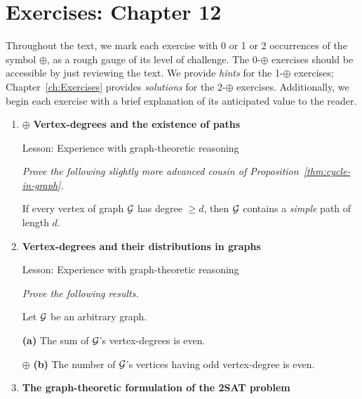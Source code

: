 
\section{Exercises: Chapter 12}

Throughout the text, we mark each exercise with 0 or 1 or 2 occurrences of the symbol $\oplus$, as a rough gauge of its level of challenge.  The 0-$\oplus$ exercises should be accessible by just reviewing the text.  We provide {\em hints} for the 1-$\oplus$ exercises; Chapter~\ref{ch:Exercises} provides {\em solutions} for the 2-$\oplus$ exercises.  Additionally, we begin each exercise with a brief explanation of its anticipated value to the reader.

\begin{enumerate}
\item
$\oplus$
{\bf Vertex-degrees and the existence of paths}

{\sc Lesson:} Experience with graph-theoretic reasoning

\smallskip

{\em Prove the following slightly more advanced cousin of Proposition~\ref{thm:cycle-in-graph}.}

 

\begin{prop}
If every vertex of graph $\mbox{$\cal G$}$ has degree $\geq d$, then $\mbox{$\cal G$}$ contains a {\em simple} path of length $d$.
\end{prop}

\smallskip

\medskip\item
{\bf Vertex-degrees and their distributions in graphs}

{\sc Lesson:} Experience with graph-theoretic reasoning

\smallskip

{\em Prove the following results.}

\begin{prop}
Let $\mbox{$\cal G$}$ be an arbitrary graph.
\smallskip

\noindent
{\bf (a)} The sum of $\mbox{$\cal G$}$'s vertex-degrees is even.

\smallskip

\noindent $\oplus$ {\bf (b)}
The number of $\mbox{$\cal G$}$'s vertices having odd vertex-degree is even.
\end{prop}

\medskip\item
{\bf The graph-theoretic formulation of the {\sf 2SAT} problem}


\end{enumerate}
